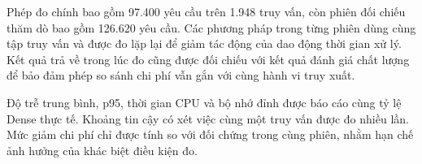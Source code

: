 Phép đo chính bao gồm 97.400 yêu cầu trên 1.948 truy vấn, còn phiên đối chiếu thăm dò bao gồm 126.620 yêu cầu. Các phương pháp trong từng phiên dùng cùng tập truy vấn và được đo lặp lại để giảm tác động của dao động thời gian xử lý. Kết quả trả về trong lúc đo cũng được đối chiếu với kết quả đánh giá chất lượng để bảo đảm phép so sánh chi phí vẫn gắn với cùng hành vi truy xuất.

Độ trễ trung bình, p95, thời gian CPU và bộ nhớ đỉnh được báo cáo cùng tỷ lệ Dense thực tế. Khoảng tin cậy có xét việc cùng một truy vấn được đo nhiều lần. Mức giảm chi phí chỉ được tính so với đối chứng trong cùng phiên, nhằm hạn chế ảnh hưởng của khác biệt điều kiện đo.
